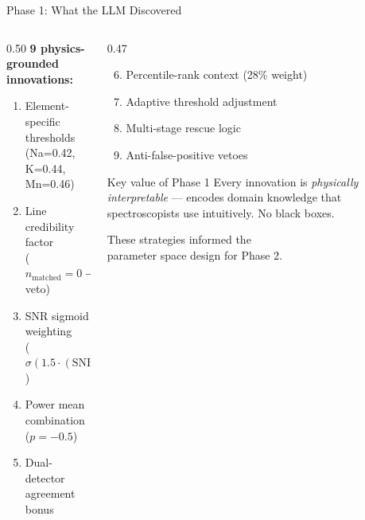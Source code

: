 \documentclass[aspectratio=169,12pt]{beamer}
\begin{document}
\begin{frame}{Phase 1: What the LLM Discovered}
  \begin{columns}[T]
    \begin{column}{0.50\textwidth}
      \textbf{9 physics-grounded innovations:}
      \begin{enumerate}
        \item Element-specific thresholds\\
              {\scriptsize (Na=0.42, K=0.44, Mn=0.46)}
        \item Line credibility factor\\
              {\scriptsize ($n_\mathrm{matched}=0 \to$ veto)}
        \item SNR sigmoid weighting\\
              {\scriptsize ($\sigma(1.5 \cdot (\mathrm{SNR}-2.5))$)}
        \item Power mean combination ($p=-0.5$)
        \item Dual-detector agreement bonus
      \end{enumerate}
    \end{column}
    \begin{column}{0.47\textwidth}
      \begin{enumerate}\setcounter{enumi}{5}
        \item Percentile-rank context (28\% weight)
        \item Adaptive threshold adjustment
        \item Multi-stage rescue logic
        \item Anti-false-positive vetoes
      \end{enumerate}

      \vspace{0.5em}
      \begin{exampleblock}{Key value of Phase 1}
        Every innovation is \emph{physically interpretable} ---
        encodes domain knowledge that spectroscopists use intuitively.
        No black boxes.
      \end{exampleblock}

      \vspace{0.3em}
      {\scriptsize These strategies informed the\\
       parameter space design for Phase 2.}
    \end{column}
  \end{columns}
\end{frame}
\end{document}
